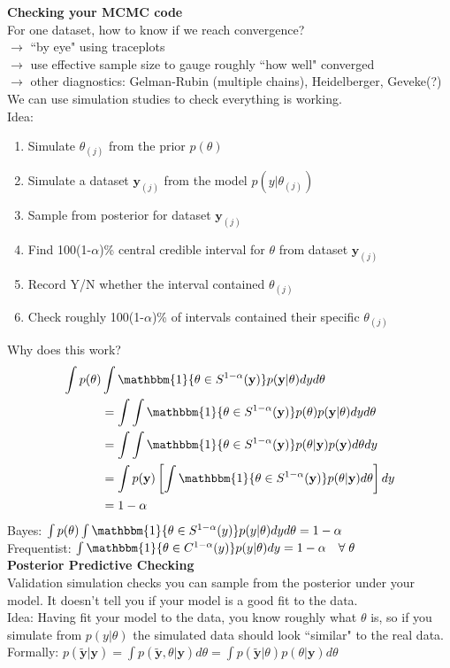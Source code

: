 \documentclass[11pt]{article}
\begin{document}
\noindent\textbf{Checking your MCMC code}\\
For one dataset, how to know if we reach convergence?\\
$\rightarrow$ ``by eye" using traceplots\\
$\rightarrow$ use effective sample size to gauge roughly ``how well" converged\\
$\rightarrow$ other diagnostics: Gelman-Rubin (multiple chains), Heidelberger, Geveke(?)
\newpage
\noindent We can use simulation studies to check everything is working.\\
Idea:
\begin{enumerate}
\item Simulate $\theta_{(j)}$ from the prior $p(\theta)$
\item Simulate a dataset $\mathbf{y}_{(j)}$ from the model $p(y|\theta_{(j)})$
\item Sample from posterior for dataset $\mathbf{y}_{(j)}$
\item Find 100(1-$\alpha$)\% central credible interval for $\theta$ from dataset $\mathbf{y}_{(j)}$
\item Record Y/N whether the interval contained $\theta_{(j)}$
\item Check roughly 100(1-$\alpha$)\% of intervals contained their specific $\theta_{(j)}$
\end{enumerate}
Why does this work?
\begin{align*}
\int p(\theta)&\int\mathbbm{1}\{\theta\in S^{1-\alpha}(\mathbf{y})\}p(\mathbf{y}|\theta)dyd\theta\\
&=\int\int\mathbbm{1}\{\theta\in S^{1-\alpha}(\mathbf{y})\}p(\theta)p(\mathbf{y}|\theta)dyd\theta\\
&=\int\int\mathbbm{1}\{\theta\in S^{1-\alpha}(\mathbf{y})\}p(\theta|\mathbf{y})p(\mathbf{y})d\theta dy\\
&=\int p(\mathbf{y})\left[\int\mathbbm{1}\{\theta\in S^{1-\alpha}(\mathbf{y})\}p(\theta|\mathbf{y})d\theta\right]dy\\
&=1-\alpha
\end{align*}
Bayes: $\int p(\theta)\int\mathbbm{1}\{\theta\in S^{1-\alpha}(y)\}p(y|\theta)dyd\theta=1-\alpha$\\
Frequentist: $\int\mathbbm{1}\{\theta\in C^{1-\alpha}(y)\}p(y|\theta)dy=1-\alpha\quad\forall\;\theta$\\

\noindent\textbf{Posterior Predictive Checking}\\
Validation simulation checks you can sample from the posterior under your model. It doesn't tell you if your model is a good fit to the data.\\
Idea: Having fit your model to the data, you know roughly what $\theta$ is, so if you simulate from $p(y|\theta)$ the simulated data should look ``similar" to the real data.\\
Formally: $p(\tilde{\mathbf{y}}|\mathbf{y})=\int p(\tilde{\mathbf{y}},\theta|\mathbf{y})d\theta = \int p(\tilde{\mathbf{y}}|\theta)p(\theta|\mathbf{y})d\theta$\\
\end{document}

